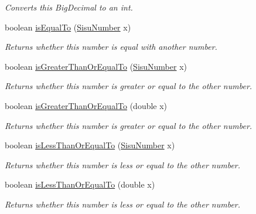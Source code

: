 \begin{DoxyCompactItemize}
\begin{DoxyCompactList}\small\item\em Converts this Big\+Decimal to an int. \end{DoxyCompactList}\item 
boolean \hyperlink{classcom_1_1aarrelaakso_1_1drawl_1_1_sisu_number_a067562e572694bb862cc6c3592bf984b}{is\+Equal\+To} (\hyperlink{classcom_1_1aarrelaakso_1_1drawl_1_1_sisu_number}{Sisu\+Number} x)
\begin{DoxyCompactList}\small\item\em Returns whether this number is equal with another number. \end{DoxyCompactList}\item 
boolean \hyperlink{classcom_1_1aarrelaakso_1_1drawl_1_1_sisu_number_a048bb7557101bf8d82245f56a6af6735}{is\+Greater\+Than\+Or\+Equal\+To} (\hyperlink{classcom_1_1aarrelaakso_1_1drawl_1_1_sisu_number}{Sisu\+Number} x)
\begin{DoxyCompactList}\small\item\em Returns whether this number is greater or equal to the other number. \end{DoxyCompactList}\item 
boolean \hyperlink{classcom_1_1aarrelaakso_1_1drawl_1_1_sisu_number_ae99967be90c7a0a7c0233556f7df30ef}{is\+Greater\+Than\+Or\+Equal\+To} (double x)
\begin{DoxyCompactList}\small\item\em Returns whether this number is greater or equal to the other number. \end{DoxyCompactList}\item 
boolean \hyperlink{classcom_1_1aarrelaakso_1_1drawl_1_1_sisu_number_a82c8315d1b7d7abd9898374db55e8395}{is\+Less\+Than\+Or\+Equal\+To} (\hyperlink{classcom_1_1aarrelaakso_1_1drawl_1_1_sisu_number}{Sisu\+Number} x)
\begin{DoxyCompactList}\small\item\em Returns whether this number is less or equal to the other number. \end{DoxyCompactList}\item 
boolean \hyperlink{classcom_1_1aarrelaakso_1_1drawl_1_1_sisu_number_ad1ea9f6dcbf997db828ee02b7c0aef94}{is\+Less\+Than\+Or\+Equal\+To} (double x)
\begin{DoxyCompactList}\small\item\em Returns whether this number is less or equal to the other number. \end{DoxyCompactList}\item 

\end{DoxyCompactItemize}

